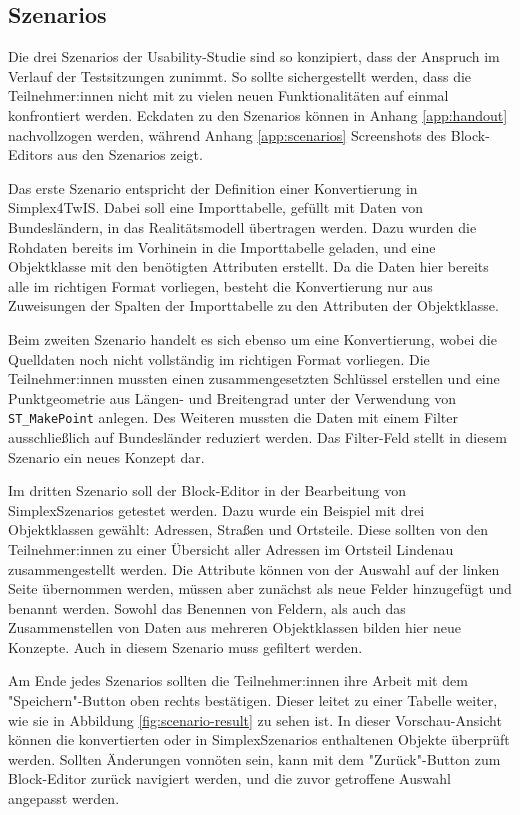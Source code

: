 \subsection{Szenarios}
\label{sec:study-szenarios}
Die drei Szenarios der Usability-Studie sind so konzipiert, dass der Anspruch im Verlauf der Testsitzungen zunimmt. So sollte sichergestellt werden, dass die Teilnehmer:innen nicht mit zu vielen neuen Funktionalitäten auf einmal konfrontiert werden. Eckdaten zu den Szenarios können in Anhang \ref{app:handout} nachvollzogen werden, während Anhang \ref{app:scenarios} Screenshots des Block-Editors aus den Szenarios zeigt.

Das erste Szenario entspricht der Definition einer Konvertierung in Simplex4TwIS. Dabei soll eine Importtabelle, gefüllt mit Daten von Bundesländern, in das Realitätsmodell übertragen werden. Dazu wurden die Rohdaten bereits im Vorhinein in die Importtabelle geladen, und eine Objektklasse mit den benötigten Attributen erstellt. Da die Daten hier bereits alle im richtigen Format vorliegen, besteht die Konvertierung nur aus Zuweisungen der Spalten der Importtabelle zu den Attributen der Objektklasse.

Beim zweiten Szenario handelt es sich ebenso um eine Konvertierung, wobei die Quelldaten noch nicht vollständig im richtigen Format vorliegen. Die Teilnehmer:innen mussten einen zusammengesetzten Schlüssel erstellen und eine Punktgeometrie aus Längen- und Breitengrad unter der Verwendung von \texttt{ST\_MakePoint} anlegen. Des Weiteren mussten die Daten mit einem Filter ausschließlich auf Bundesländer reduziert werden. Das Filter-Feld stellt in diesem Szenario ein neues Konzept dar.

Im dritten Szenario soll der Block-Editor in der Bearbeitung von SimplexSzenarios getestet werden. Dazu wurde ein Beispiel mit drei Objektklassen gewählt: Adressen, Straßen und Ortsteile. Diese sollten von den Teilnehmer:innen zu einer Übersicht aller Adressen im Ortsteil Lindenau zusammengestellt werden. Die Attribute können von der Auswahl auf der linken Seite übernommen werden, müssen aber zunächst als neue Felder hinzugefügt und benannt werden. Sowohl das Benennen von Feldern, als auch das Zusammenstellen von Daten aus mehreren Objektklassen bilden hier neue Konzepte. Auch in diesem Szenario muss gefiltert werden.

Am Ende jedes Szenarios sollten die Teilnehmer:innen ihre Arbeit mit dem "Speichern"-Button oben rechts bestätigen. Dieser leitet zu einer Tabelle weiter, wie sie in Abbildung \ref{fig:scenario-result} zu sehen ist. In dieser Vorschau-Ansicht können die konvertierten oder in SimplexSzenarios enthaltenen Objekte überprüft werden. Sollten Änderungen vonnöten sein, kann mit dem "Zurück"-Button zum Block-Editor zurück navigiert werden, und die zuvor getroffene Auswahl angepasst werden.

